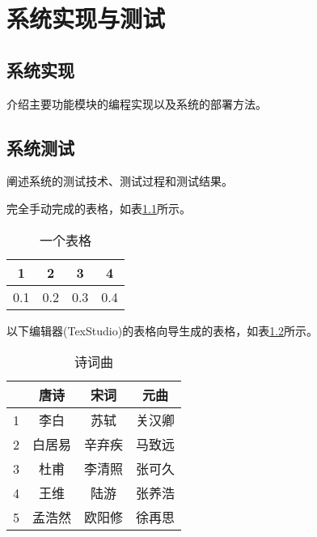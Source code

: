 

\chapter{系统实现与测试}

\section{系统实现}
介绍主要功能模块的编程实现以及系统的部署方法。

\section{系统测试}
阐述系统的测试技术、测试过程和测试结果。

完全手动完成的表格，如表\ref{tab:tab1}所示。
\begin{table}[htbp] %
	\centering  %
	\caption{一个表格}  %
	\label{tab:tab1}  %
	\begin{tabular}{|c|c|c|c|}   
		\hline  %
		1 & 2 & 3 & 4 \\  %
		\hline 
		0.1 & 0.2 & 0.3 & 0.4 \\
		\hline
	\end{tabular}
\end{table}

以下编辑器(TexStudio)的表格向导生成的表格，如表\ref{tab:tab2}所示。
\begin{table}[htbp]
	\centering  
	\caption{诗词曲}   
    \label{tab:tab2}  
    \begin{tabular}{|c|c|c|c|}
        \hline 
          & 唐诗 & 宋词 & 元曲 \\ 
        \hline 
        1 & 李白 & 苏轼 & 关汉卿 \\ 
        \hline 
        2 & 白居易 & 辛弃疾 & 马致远 \\ 
        \hline 
        3 & 杜甫 & 李清照 & 张可久 \\ 
        \hline 
        4 & 王维 & 陆游 & 张养浩 \\ 
        \hline 
        5 & 孟浩然 & 欧阳修 & 徐再思 \\ 
        \hline 
    \end{tabular}  
\end{table}

